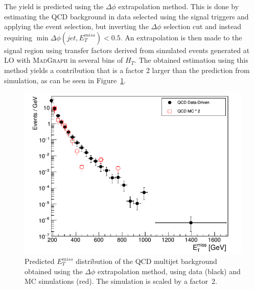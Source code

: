 The yield is predicted using 
the $\Delta\phi$ extrapolation method. This is done by estimating the QCD background in data selected using the signal triggers and applying the event selection, but inverting the $\Delta\phi$ selection cut and instead requiring $\min\Delta\phi(jet, E_T^{miss}) < 0.5$. An extrapolation is then made to the signal region using transfer factors derived from simulated events generated at \ac{LO} with \textsc{MadGraph} in several bins of $H_T$. The obtained estimation using this method yields a contribution that is a factor 2 larger than the prediction from simulation, 
as can be seen in Figure~\ref{fig:QCD_prediction}.

\begin{figure}[ht]
  \centering
 \includegraphics[width=.7\textwidth]{QCD_prediction.png} 
 \caption{Predicted $E_T^{miss}$ distribution of the QCD multijet background obtained using the $\Delta\phi$ extrapolation method, using data (black) and MC simulations (red). The simulation is scaled by a factor~2.}
 \label{fig:QCD_prediction}
\end{figure}


